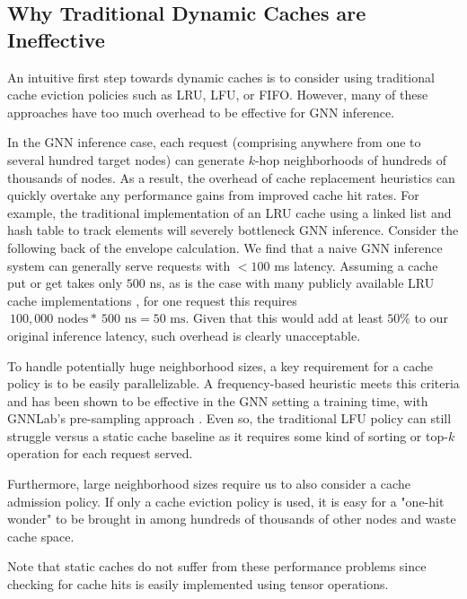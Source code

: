 \subsection{Why Traditional Dynamic Caches are Ineffective} \label{Design: strawman}
An intuitive first step towards dynamic caches is to consider using traditional cache eviction policies such as LRU, LFU, or FIFO. However, many of these approaches have too much overhead to be effective for GNN inference. 

In the GNN inference case, each request (comprising anywhere from one to several hundred target nodes) can generate $k$-hop neighborhoods of hundreds of thousands of nodes.
As a result, the overhead of cache replacement heuristics can quickly overtake any performance gains from improved cache hit rates. For example, the traditional implementation of an LRU cache using a linked list and hash table to track elements will severely bottleneck GNN inference. Consider the following back of the envelope calculation. We find that a naive GNN inference system can generally serve requests with $< 100$ ms latency. Assuming a cache put or get takes only $500$ ns, as is the case with many publicly available LRU cache implementations \cite{HashiCorp_GoLang_LRU}, for one request this requires $~100,000 \text{ nodes} * ~500 \text{ ns} = 50 \text{ ms}$. Given that this would add at least $50\%$ to our original inference latency, such overhead is clearly unacceptable. 

To handle potentially huge neighborhood sizes, a key requirement for a cache policy is to be easily parallelizable. A frequency-based heuristic meets this criteria and has been shown to be effective in the GNN setting a training time, with GNNLab's pre-sampling approach \cite{GNNLab_2022}. Even so, the traditional LFU policy can still struggle versus a static cache baseline as it requires some kind of sorting or top-$k$ operation for each request served.

Furthermore, large neighborhood sizes require us to also consider a cache admission policy. If only a cache eviction policy is used, it is easy for a "one-hit wonder" to be brought in among hundreds of thousands of other nodes and waste cache space.

Note that static caches do not suffer from these performance problems since checking for cache hits is easily implemented using tensor operations.

